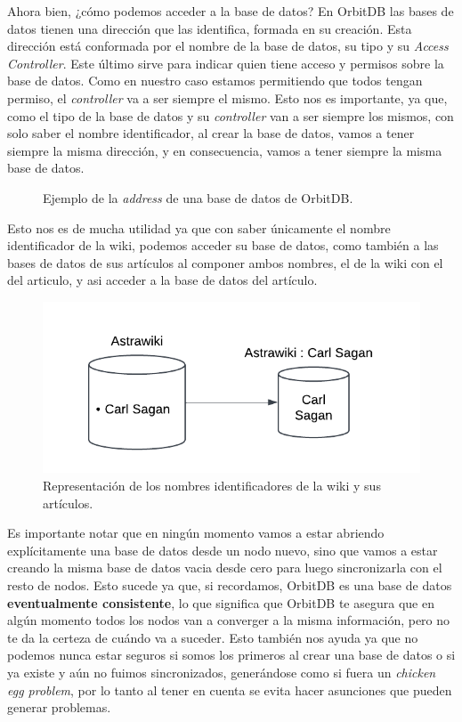 Ahora bien, ¿cómo podemos acceder a la base de datos? En OrbitDB las bases de datos tienen una dirección que las identifica, formada en su creación. Esta dirección está conformada por el nombre de la base de datos, su tipo y su \textit{Access Controller}. Este último sirve para indicar quien tiene acceso y permisos sobre la base de datos. Como en nuestro caso estamos permitiendo que todos tengan permiso, el \textit{controller} va a ser siempre el mismo. Esto nos es importante, ya que, como el tipo de la base de datos y su \textit{controller} van a ser siempre los mismos, con solo saber el nombre identificador, al crear la base de datos, vamos a tener siempre la misma dirección, y en consecuencia, vamos a tener siempre la misma base de datos. 

\begin{figure}[H]
\centering
{}
\caption{Ejemplo de la \textit{address} de una base de datos de OrbitDB.}
\end{figure}

Esto nos es de mucha utilidad ya que con saber únicamente el nombre identificador de la wiki, podemos acceder su base de datos, como también a las bases de datos de sus artículos al componer ambos nombres, el de la wiki con el del articulo, y asi acceder a la base de datos del artículo.

\begin{figure}[H]
    \centering
    \includegraphics[width=0.6\linewidth]{img/solucion-ipfs/bdd-names.png}
    \caption{Representación de los nombres identificadores de la wiki y sus artículos.}
    \label{fig:bdd-names}
\end{figure}

Es importante notar que en ningún momento vamos a estar abriendo explícitamente una base de datos desde un nodo nuevo, sino que vamos a estar creando la misma base de datos vacia desde cero para luego sincronizarla con el resto de nodos. Esto sucede ya que, si recordamos, OrbitDB es una base de datos \textbf{eventualmente consistente}, lo que significa que OrbitDB te asegura que en algún momento todos los nodos van a converger a la misma información, pero no te da la certeza de cuándo va a suceder. Esto también nos ayuda ya que no podemos nunca estar seguros si somos los primeros al crear una base de datos o si ya existe y aún no fuimos sincronizados, generándose como si fuera un \textit{chicken egg problem}, por lo tanto al tener en cuenta se evita hacer asunciones que pueden generar problemas.


